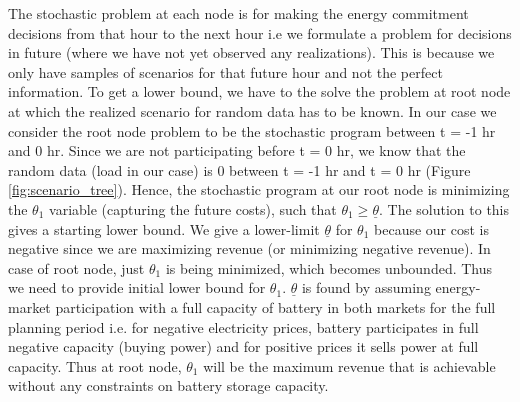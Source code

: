 \documentclass[11pt,twoside]{article}
\begin{document}
The stochastic problem at each node is for making the energy commitment decisions from that hour to the next hour i.e we formulate a problem for decisions in future (where we have not yet observed any realizations). This is because we only have samples of scenarios for that future hour and not the perfect information. To get a lower bound, we have to the solve the problem at root node at which the realized scenario for random data has to be known. In our case we consider the root node problem to be the stochastic program between t = -1 hr and 0 hr. Since we are not participating before t = 0 hr, we know that the random data (load in our case) is 0 between t = -1 hr and t = 0 hr (Figure \ref{fig:scenario_tree}). Hence, the stochastic program at our root node is minimizing the $\theta_{1}$ variable (capturing the future costs), such that $\theta_{1} \geq \underline{\theta}$. The solution to this gives a starting lower bound. We give a lower-limit $\underline{\theta}$ for $\theta_1$ because our cost is negative since we are maximizing revenue (or minimizing negative revenue). In case of root node, just $\theta_1$ is being minimized, which becomes unbounded. Thus we need to provide initial lower bound for $\theta_1$. $\underline{\theta}$ is found by assuming energy-market participation with a full capacity of battery in both markets for the full planning period i.e. for negative electricity prices, battery participates in full negative capacity (buying power) and for positive prices it sells power at full capacity. Thus at root node, $\theta_1$ will be the maximum revenue that is achievable without any constraints on battery storage capacity.   
\end{document}
